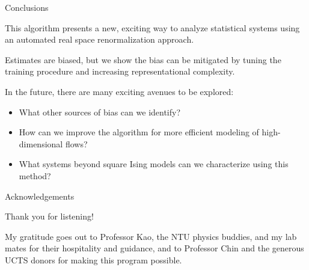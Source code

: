 \documentclass[aspectratio=169, 12pt]{beamer}
\begin{document}
\begin{frame}{Conclusions}

    This algorithm presents a new, exciting way to analyze statistical systems using an automated real space renormalization approach. 

    \vspace{1em}

    Estimates are biased, but we show the bias can be mitigated by tuning the training procedure and increasing representational complexity. 

    \vspace{1em}
    
    In the future, there are many exciting avenues to be explored:
    \begin{itemize}
        \item What other sources of bias can we identify?
        \item How can we improve the algorithm for more efficient modeling of high-dimensional flows? 
        \item What systems beyond square Ising models can we characterize using this method? 
    \end{itemize}
\end{frame}

\begin{frame}{Acknowledgements}

    Thank you for listening!

    \vspace{1em}

    My gratitude goes out to Professor Kao, the NTU physics buddies, and my lab mates for their hospitality and guidance, and to Professor Chin and the generous UCTS donors for making this program possible. 
    
\end{frame}
\end{document}
